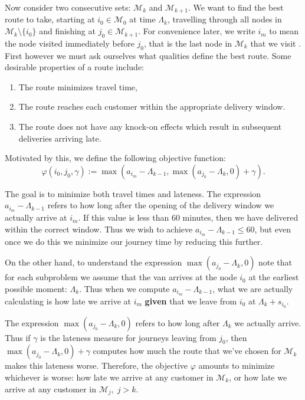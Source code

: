 Now consider two consecutive sets: $\mathcal{M}_k$ and $\mathcal{M}_{k+1}$. We want to find the best route to take, starting at $i_0 \in \mathcal{M}_0$ at time $\Lambda_k$, travelling through all nodes in $\mathcal{M}_k \setminus \{i_0\}$ and finishing at $j_0 \in \mathcal{M}_{k+1}$. For convenience later, we write $i_m$ to mean the node visited immediately before $j_0$, that is the last node in $\mathcal{M}_k$ that we visit . First however we must ask ourselves what qualities define the best route. Some desirable properties of a route include:
\begin{enumerate}
	\item The route minimizes travel time,
	\item The route reaches each customer within the appropriate delivery window.
	\item The route does not have any knock-on effects which result in subsequent deliveries arriving late.
\end{enumerate}

Motivated by this, we define the following objective function:
\begin{equation}
\label{eq:dynam_objective}
\varphi(i_0, j_0, \gamma):= \max\left(a_{i_m} - \Lambda_{k-1}, \max(a_{j_0} - \Lambda_k,0) + \gamma\right).
\end{equation}

The goal is to minimize both travel times and lateness. The expression $a_{i_m} - \Lambda_{k-1}$ refers to how long after the opening of the delivery window we actually arrive at $i_m$. If this value is less than 60 minutes, then we have delivered within the correct window. Thus we wish to achieve $a_{i_m} - \Lambda_{k-1}\leq 60$, but even once we do this we minimize our journey time by reducing this further.

On the other hand, to understand the expression $ \max(a_{j_0} - \Lambda_k,0)$ note that for each subproblem we assume that the van arrives at the node $i_0$ at the earliest possible moment: $\Lambda_k$. Thus when we compute $a_{i_m} - \Lambda_{k-1}$, what we are actually calculating is how late we arrive at $i_m$ \textbf{given} that we leave from $i_0$ at $\Lambda_k + s_{i_0}$. 

The expression  $ \max(a_{j_0} - \Lambda_k,0)$ refers to how long after $\Lambda_k$ we actually arrive. Thus if $\gamma$ is the lateness measure for journeys leaving from $j_0$, then $\max(a_{j_0} - \Lambda_k,0) + \gamma$ computes how much the route that we've chosen for $\mathcal{M}_k$ makes this lateness worse. Therefore, the objective $\varphi$ amounts to minimize whichever is worse: how late we arrive at any customer in $\mathcal{M}_k$, or how late we arrive at any customer in $\mathcal{M}_j,\; j>k$. 

